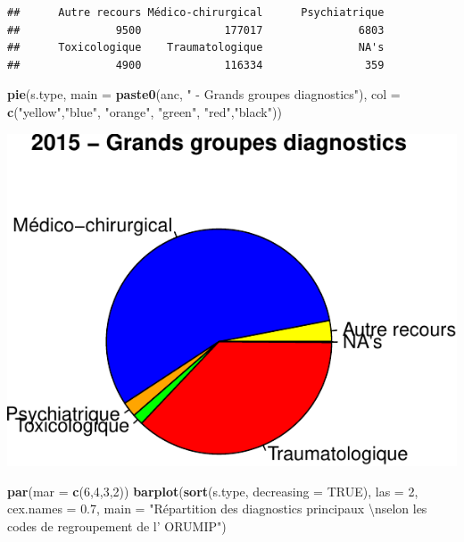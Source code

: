 \documentclass[]{article}
\newenvironment{Shaded}{\begin{snugshade}}{\end{snugshade}}
\newcommand{\KeywordTok}[1]{\textcolor[rgb]{0.13,0.29,0.53}{\textbf{{#1}}}}
\newcommand{\DataTypeTok}[1]{\textcolor[rgb]{0.13,0.29,0.53}{{#1}}}
\newcommand{\DecValTok}[1]{\textcolor[rgb]{0.00,0.00,0.81}{{#1}}}
\newcommand{\FloatTok}[1]{\textcolor[rgb]{0.00,0.00,0.81}{{#1}}}
\newcommand{\CharTok}[1]{\textcolor[rgb]{0.31,0.60,0.02}{{#1}}}
\newcommand{\StringTok}[1]{\textcolor[rgb]{0.31,0.60,0.02}{{#1}}}
\newcommand{\OtherTok}[1]{\textcolor[rgb]{0.56,0.35,0.01}{{#1}}}
\newcommand{\NormalTok}[1]{{#1}}
\begin{document}
\begin{verbatim}
##      Autre recours Médico-chirurgical      Psychiatrique 
##               9500             177017               6803 
##      Toxicologique    Traumatologique               NA's 
##               4900             116334                359
\end{verbatim}

\begin{Shaded}
\begin{Highlighting}[]
\KeywordTok{pie}\NormalTok{(s.type, }\DataTypeTok{main =} \KeywordTok{paste0}\NormalTok{(anc, }\StringTok{" - Grands groupes diagnostics"}\NormalTok{), }\DataTypeTok{col =} \KeywordTok{c}\NormalTok{(}\StringTok{"yellow"}\NormalTok{,}\StringTok{"blue"}\NormalTok{, }\StringTok{"orange"}\NormalTok{, }\StringTok{"green"}\NormalTok{, }\StringTok{"red"}\NormalTok{,}\StringTok{"black"}\NormalTok{))}
\end{Highlighting}
\end{Shaded}

\includegraphics{analyse_merge_files/figure-latex/type_urgence-1.pdf}\\

\begin{Shaded}
\begin{Highlighting}[]
\KeywordTok{par}\NormalTok{(}\DataTypeTok{mar =} \KeywordTok{c}\NormalTok{(}\DecValTok{6}\NormalTok{,}\DecValTok{4}\NormalTok{,}\DecValTok{3}\NormalTok{,}\DecValTok{2}\NormalTok{))}
\KeywordTok{barplot}\NormalTok{(}\KeywordTok{sort}\NormalTok{(s.type, }\DataTypeTok{decreasing =} \OtherTok{TRUE}\NormalTok{), }\DataTypeTok{las =} \DecValTok{2}\NormalTok{, }\DataTypeTok{cex.names =} \FloatTok{0.7}\NormalTok{, }\DataTypeTok{main =} \StringTok{"Répartition des diagnostics principaux }\CharTok{\textbackslash{}n}\StringTok{selon les codes de regroupement de l' ORUMIP"}\NormalTok{)}
\end{Highlighting}
\end{Shaded}
\end{document}
